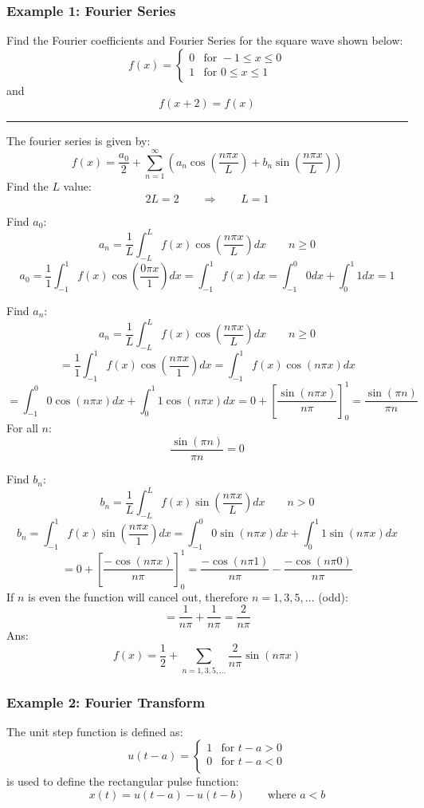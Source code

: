 \subsubsection{Example 1: Fourier Series}
Find the Fourier coefficients and Fourier Series for the square wave shown below:
$$f(x)=\begin{cases}
  0 &  \text{for }-1\leq x\leq0\\
  1 & \text{for }0\leq x\leq 1
\end{cases}$$
and
$$f(x+2)=f(x)$$


\noindent\rule{\textwidth}{1pt}

The fourier series is given by:
$$f(x)=\frac{a_{0}}{2}+\sum_{n=1}^{\infty}\left( a_{n}\cos\left( \frac{n\pi x}{L} \right)+b_{n}\sin\left( \frac{n\pi x}{L} \right) \right)$$
Find the $L$ value:
$$2L=2\qquad \Rightarrow \qquad L=1$$

Find $a_0$:
$$a_n  =\frac{1}{L} \int_{-L}^L f(x) \cos \left(\frac{n \pi x}{L}\right) d x\qquad   n \geq 0$$
$$a_0  =\frac{1}{1} \int_{-1}^1 f(x) \cos \left(\frac{0 \pi x}{1}\right) d x=\int_{-1}^1 f(x) d x=\int_{-1}^0 0 d x+\int_{0}^1 1 d x=1$$

Find $a_n$:
$$a_n  =\frac{1}{L} \int_{-L}^L f(x) \cos \left(\frac{n \pi x}{L}\right) d x\qquad   n \geq 0$$
$$=\frac{1}{1} \int_{-1}^1 f(x) \cos \left(\frac{n \pi x}{1}\right) d x=\int_{-1}^1 f(x) \cos \left(n \pi x\right) d x$$
$$=\int_{-1}^0 0 \cos \left(n \pi x\right) d x+\int_{0}^1 1 \cos \left(n \pi x\right) d x=0+\left[\frac{\sin(n\pi x)}{n\pi}\right]^1_0=\frac{\sin (\pi  n)}{\pi  n}$$
For all $n$:
$$\frac{\sin (\pi  n)}{\pi  n}=0$$

Find $b_n$:
$$b_n  =\frac{1}{L} \int_{-L}^L f(x) \sin \left(\frac{n \pi x}{L}\right) d x\qquad   n>0$$
$$b_n  =\int_{-1}^1 f(x) \sin \left(\frac{n \pi x}{1}\right) d x=\int_{-1}^0 0 \sin \left(n \pi x\right) d x+\int_{0}^1 1 \sin \left(n \pi x\right) d x$$
$$=0+\left[\frac{-\cos(n\pi x)}{n\pi}\right]^1_0=\frac{-\cos(n\pi 1)}{n\pi}-\frac{-\cos(n\pi 0)}{n\pi}$$
If $n$ is even the function will cancel out, therefore $n=1,3,5,\dots$ (odd):
$$=\frac{1}{n\pi}+\frac{1}{n\pi}=\frac{2}{n\pi}$$
Ans:
$$f(x)=\frac{1}{2}+\sum_{n=1,3,5,\dots}\frac{2}{n\pi}\sin(n\pi x)$$
\subsubsection{Example 2: Fourier Transform}
The unit step function is defined as:
$$u(t-a)=\begin{cases}
  1&  \text{for }t-a>0\\
  0&  \text{for }t-a<0\\
\end{cases}$$
is used to define the rectangular pulse function:
$$x(t)=u(t-a)-u(t-b)\qquad \text{where }a<b$$

